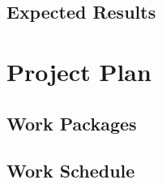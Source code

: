 \documentclass[12pt]{article}
\begin{document}
    \subsection{Expected Results}


\section{Project Plan}

    \subsection{Work Packages}

    \subsection{Work Schedule}

\printbibliography

\end{document}
